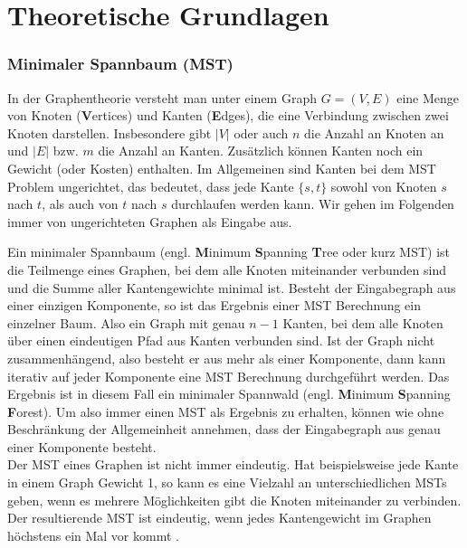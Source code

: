 \chapter{Theoretische Grundlagen}\label{Grundlagen}


\subsection{Minimaler Spannbaum (MST)}
In der Graphentheorie versteht man unter einem Graph $G = (V,E)$ eine Menge von Knoten (\textbf{V}ertices) und Kanten (\textbf{E}dges), die eine Verbindung zwischen zwei Knoten darstellen. Insbesondere gibt $|V|$ oder auch $n$ die Anzahl an Knoten an und $|E|$ bzw. $m$ die Anzahl an Kanten. Zusätzlich können Kanten noch ein Gewicht (oder Kosten) enthalten. 
Im Allgemeinen sind Kanten bei dem MST Problem ungerichtet, das bedeutet, dass jede Kante $\{s,t\}$ sowohl von Knoten $s$ nach $t$, als auch von $t$ nach $s$ durchlaufen werden kann. Wir gehen im Folgenden immer von ungerichteten Graphen als Eingabe aus.

Ein minimaler Spannbaum (engl. \textbf{M}inimum \textbf{S}panning \textbf{T}ree oder kurz MST) ist die Teilmenge eines Graphen, bei dem alle Knoten miteinander verbunden sind und die Summe aller Kantengewichte minimal ist. Besteht der Eingabegraph aus einer einzigen Komponente, so ist das Ergebnis einer MST Berechnung ein einzelner Baum. Also ein Graph mit genau $n-1$ Kanten, bei dem alle Knoten über einen eindeutigen Pfad aus Kanten verbunden sind.
Ist der Graph nicht zusammenhängend, also besteht er aus mehr als einer Komponente, dann kann iterativ auf jeder Komponente eine MST Berechnung durchgeführt werden. Das Ergebnis ist in diesem Fall ein minimaler Spannwald (engl. \textbf{M}inimum \textbf{S}panning \textbf{F}orest).
Um also immer einen MST als Ergebnis zu erhalten, können wie ohne Beschränkung der Allgemeinheit annehmen, dass der Eingabegraph aus genau einer Komponente besteht.\\
Der MST eines Graphen ist nicht immer eindeutig. Hat beispielsweise jede Kante in einem Graph Gewicht 1, so kann es eine Vielzahl an unterschiedlichen MSTs geben, wenn es mehrere Möglichkeiten gibt die Knoten miteinander zu verbinden. Der resultierende MST ist eindeutig, wenn jedes Kantengewicht im Graphen höchstens ein Mal vor kommt \cite{sanders2019sequential}. 


